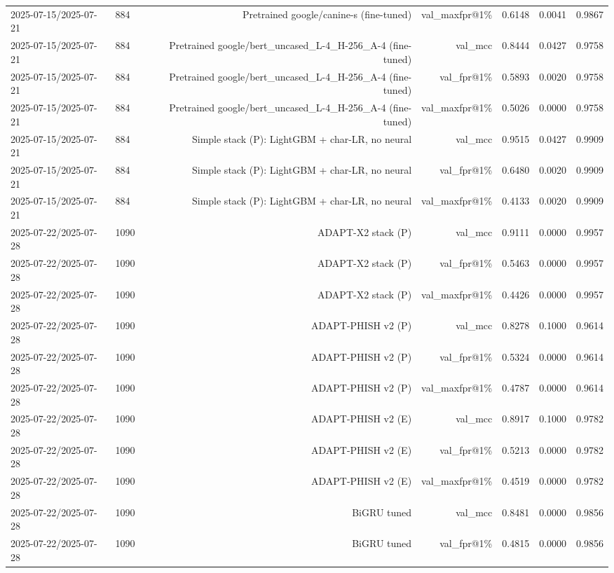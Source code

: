 \begin{table}[t]
\begin{tabular}{llrrrrr}
2025-07-15/2025-07-21 & 884 & Pretrained google/canine-s (fine-tuned) & val\_maxfpr@1\% & 0.6148 & 0.0041 & 0.9867 \\
2025-07-15/2025-07-21 & 884 & Pretrained google/bert\_uncased\_L-4\_H-256\_A-4 (fine-tuned) & val\_mcc & 0.8444 & 0.0427 & 0.9758 \\
2025-07-15/2025-07-21 & 884 & Pretrained google/bert\_uncased\_L-4\_H-256\_A-4 (fine-tuned) & val\_fpr@1\% & 0.5893 & 0.0020 & 0.9758 \\
2025-07-15/2025-07-21 & 884 & Pretrained google/bert\_uncased\_L-4\_H-256\_A-4 (fine-tuned) & val\_maxfpr@1\% & 0.5026 & 0.0000 & 0.9758 \\
2025-07-15/2025-07-21 & 884 & Simple stack (P): LightGBM + char-LR, no neural & val\_mcc & 0.9515 & 0.0427 & 0.9909 \\
2025-07-15/2025-07-21 & 884 & Simple stack (P): LightGBM + char-LR, no neural & val\_fpr@1\% & 0.6480 & 0.0020 & 0.9909 \\
2025-07-15/2025-07-21 & 884 & Simple stack (P): LightGBM + char-LR, no neural & val\_maxfpr@1\% & 0.4133 & 0.0020 & 0.9909 \\
2025-07-22/2025-07-28 & 1090 & ADAPT-X2 stack (P) & val\_mcc & 0.9111 & 0.0000 & 0.9957 \\
2025-07-22/2025-07-28 & 1090 & ADAPT-X2 stack (P) & val\_fpr@1\% & 0.5463 & 0.0000 & 0.9957 \\
2025-07-22/2025-07-28 & 1090 & ADAPT-X2 stack (P) & val\_maxfpr@1\% & 0.4426 & 0.0000 & 0.9957 \\
2025-07-22/2025-07-28 & 1090 & ADAPT-PHISH v2 (P) & val\_mcc & 0.8278 & 0.1000 & 0.9614 \\
2025-07-22/2025-07-28 & 1090 & ADAPT-PHISH v2 (P) & val\_fpr@1\% & 0.5324 & 0.0000 & 0.9614 \\
2025-07-22/2025-07-28 & 1090 & ADAPT-PHISH v2 (P) & val\_maxfpr@1\% & 0.4787 & 0.0000 & 0.9614 \\
2025-07-22/2025-07-28 & 1090 & ADAPT-PHISH v2 (E) & val\_mcc & 0.8917 & 0.1000 & 0.9782 \\
2025-07-22/2025-07-28 & 1090 & ADAPT-PHISH v2 (E) & val\_fpr@1\% & 0.5213 & 0.0000 & 0.9782 \\
2025-07-22/2025-07-28 & 1090 & ADAPT-PHISH v2 (E) & val\_maxfpr@1\% & 0.4519 & 0.0000 & 0.9782 \\
2025-07-22/2025-07-28 & 1090 & BiGRU tuned & val\_mcc & 0.8481 & 0.0000 & 0.9856 \\
2025-07-22/2025-07-28 & 1090 & BiGRU tuned & val\_fpr@1\% & 0.4815 & 0.0000 & 0.9856 \\

\end{tabular}
\end{table}
